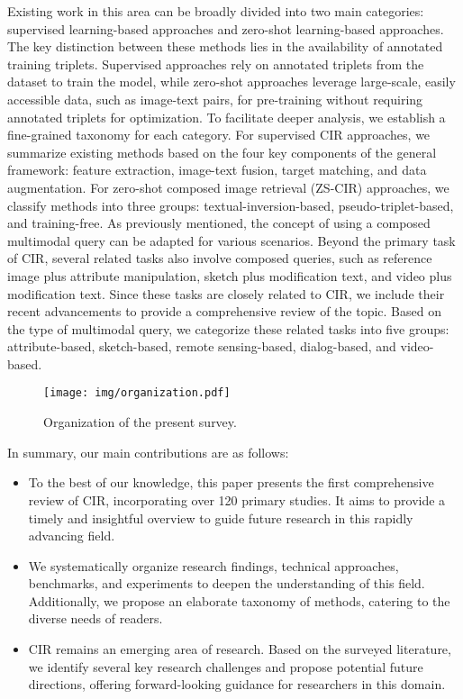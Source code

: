 Existing work in this area can be broadly divided into two main categories: supervised learning-based approaches and zero-shot learning-based approaches. The key distinction between these methods lies in the availability of annotated training triplets. Supervised approaches rely on annotated triplets from the dataset to train the model, while zero-shot approaches leverage large-scale, easily accessible data, such as image-text pairs, for pre-training without requiring annotated triplets for optimization.
To facilitate deeper analysis, we establish a fine-grained taxonomy for each category. For supervised CIR approaches, we summarize existing methods based on the four key components of the general framework: feature extraction, image-text fusion, target matching, and data augmentation. For zero-shot composed image retrieval (ZS-CIR) approaches, we classify methods into three groups: textual-inversion-based, pseudo-triplet-based, and training-free.
As previously mentioned, the concept of using a composed multimodal query can be adapted for various scenarios. Beyond the primary task of CIR, several related tasks also involve composed queries, such as reference image plus attribute manipulation, sketch plus modification text, and video plus modification text. Since these tasks are closely related to CIR, we include their recent advancements to provide a comprehensive review of the topic. Based on the type of multimodal query, we categorize these related tasks into five groups: attribute-based, sketch-based, remote sensing-based, dialog-based, and video-based.
\begin{figure}[!t]
		\centering
		\texttt{[image: img/organization.pdf]}
	    \caption{Organization of the present survey.}\label{organization}
           
\end{figure}

In summary, our main contributions are as follows:
\begin{itemize}[leftmargin=20pt]
	\item To the best of our knowledge, this paper presents the first comprehensive review of CIR, incorporating over 120 primary studies. It aims to provide a timely and insightful overview to guide future research in this rapidly advancing field.
        \item We systematically organize research findings, technical approaches, benchmarks, and experiments to deepen the understanding of this field. Additionally, we propose an elaborate taxonomy of methods, catering to the diverse needs of readers.
        \item CIR remains an emerging area of research. Based on the surveyed literature, we identify several key research challenges and propose potential future directions, offering forward-looking guidance for researchers in this domain.
\end{itemize}

